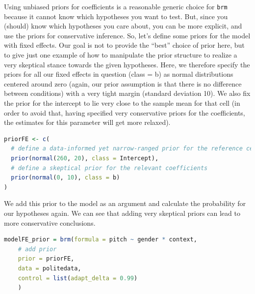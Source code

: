 \documentclass[nobib]{tufte-handout}
\begin{document}
Using unbiased priors for coefficients is a reasonable generic choice for
\texttt{brm} because it cannot know which hypotheses you want to test. But, since you (should)
know which hypotheses you care about, you can be more explicit, and use the priors for
conservative inference. So, let's define some priors for the model with fixed effects. Our goal is not to provide the ``best'' choice of prior here, but to give just one example of how to manipulate the prior structure to realize a very skeptical stance towards the given hypotheses. Here, we therefore specify the priors for all our fixed effects in
question (class = b) as normal distributions centered around zero (again, our prior assumption
is that there is no difference between conditions) with a very tight margin (standard deviation 10). We also fix the prior for the intercept to lie very close to the sample mean for that cell (in order to avoid that, having specified very conservative priors for the coefficients, the estimates for this parameter will get more relaxed).
%
%

\bigskip

\begin{minipage}[]{1\textwidth}
\begin{lstlisting}[language=R]
priorFE <- c(
  # define a data-informed yet narrow-ranged prior for the reference cell
  prior(normal(260, 20), class = Intercept),
  # define a skeptical prior for the relevant coefficients
  prior(normal(0, 10), class = b)
)
\end{lstlisting}
\end{minipage}

We add this prior to the model as an argument and calculate the probability for our hypotheses again. We can see that adding very skeptical priors can lead to more conservative conclusions.

\bigskip

\begin{minipage}[]{1\textwidth}
\begin{lstlisting}[language=R]
modelFE_prior = brm(formula = pitch ~ gender * context,
	# add prior 
	prior = priorFE,
	data = politedata,
	control = list(adapt_delta = 0.99)
	)    
\end{lstlisting}
\end{minipage}
\end{document}

